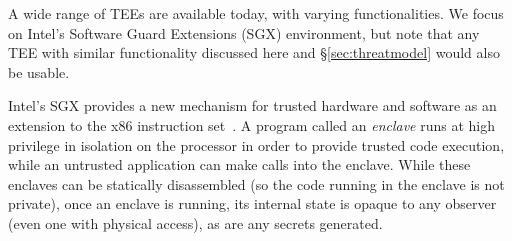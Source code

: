 A wide range of TEEs are available today, with varying functionalities.
We focus on Intel's Software Guard Extensions (SGX) environment,
but note that any TEE with similar functionality discussed here and
\S\ref{sec:threatmodel}
would also be usable.


Intel's SGX provides a new mechanism for trusted
hardware and software as an extension to the x86 instruction set~\cite{sgx,
mckeen2013innovative}.  A program called an \textit{enclave} runs at high
privilege in isolation on the processor in order to provide trusted code
execution, while an untrusted application can make calls into the enclave.
While these enclaves can be statically disassembled (so the code running in the
enclave is not private), once an enclave is running, its internal state is
opaque to any observer (even one with physical access), as are any secrets generated.  


